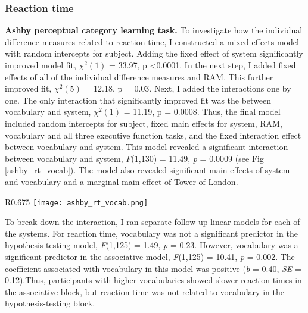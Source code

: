 \documentclass[../dissertation.tex]{subfiles}
\begin{document}
\subsubsection{Reaction time}

\textbf{Ashby perceptual category learning task.}  To investigate how the individual difference measures related to reaction time, I constructed a mixed-effects model with random intercepts for subject. Adding the fixed effect of system significantly improved model fit,  $\chi^{2}(1)$ = 33.97, p \textless 0.0001. In the next step, I added fixed effects of all of the individual difference measures and RAM. This further improved fit, $\chi^{2}(5)$ = 12.18, p = 0.03. Next, I added the interactions one by one. The only interaction that significantly improved fit was the between vocabulary and system, $\chi^{2}(1)$ = 11.19, p = 0.0008. Thus, the final model included random intercepts for subject, fixed main effects for system, RAM, vocabulary and all three executive function tasks, and the fixed interaction effect between vocabulary and system. This model revealed a significant interaction between vocabulary and system, \textit{F}(1,130) = 11.49, \textit{p} = 0.0009 (see Fig \ref{ashby_rt_vocab}). The model also revealed significant main effects of system and vocabulary and a marginal main effect of Tower of London. \par 


\begin{wrapfigure}{R}{0.675\textwidth}
\texttt{[image: ashby\_rt\_vocab.png]}
\caption[Relationships between Ashby reaction time and vocabulary]{Vocabulary is a significant predictor of reaction time in the Ashby perceptual category learning task for the associative block, but not for the hypothesis-testing block.}
\label{ashby_rt_vocab}
\vspace{-10pt}
\end{wrapfigure}	


	To break down the interaction, I ran separate follow-up linear models for each of the systems. For reaction time, vocabulary was not a significant predictor in the hypothesis-testing model, \textit{F}(1,125) = 1.49, \textit{p} = 0.23.  However, vocabulary was a significant predictor in the associative model, \textit{F}(1,125) = 10.41, \textit{p} = 0.002. The coefficient associated with vocabulary in this model was positive (\textit{b} = 0.40, \textit{SE} = 0.12).Thus, participants with higher vocabularies showed slower reaction times in the associative block, but reaction time was not related to vocabulary in the hypothesis-testing block.\par 
	
\end{document}
